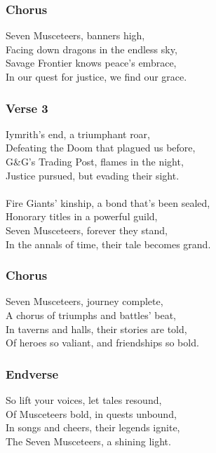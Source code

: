\documentclass[letterpaper,openany,oneside,twocolumn]{book}
\begin{document}
\subsubsection*{Chorus}
{\entryfont Seven Musceteers, banners high,}\\
Facing down dragons in the endless sky,\\
Savage Frontier knows peace's embrace,\\
In our quest for justice, we find our grace.

\subsubsection*{Verse 3}
\entryfont Iymrith's end, a triumphant roar,\\
Defeating the Doom that plagued us before,\\
G\&G's Trading Post, flames in the night,\\
Justice pursued, but evading their sight.\\\\
Fire Giants' kinship, a bond that's been sealed,\\
Honorary titles in a powerful guild,\\
Seven Musceteers, forever they stand,\\
In the annals of time, their tale becomes grand.

\subsubsection*{Chorus}
\entryfont Seven Musceteers, journey complete,\\
A chorus of triumphs and battles' beat,\\
In taverns and halls, their stories are told,\\
Of heroes so valiant, and friendships so bold.

\subsubsection*{Endverse}
So lift your voices, let tales resound,\\
Of Musceteers bold, in quests unbound,\\
In songs and cheers, their legends ignite,\\
The Seven Musceteers, a shining light.
\vfill
\end{document}
